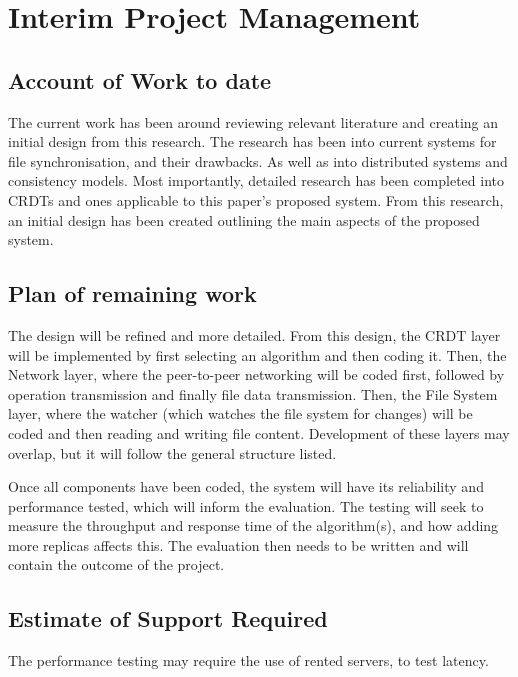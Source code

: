 \documentclass[12pt]{report}
\begin{document}
\printbibliography

\appendix

\chapter{Interim Project Management}

\section{Account of Work to date}
The current work has been around reviewing relevant literature and creating an initial design from this research. The research has been into current systems for file synchronisation, and their drawbacks. As well as into distributed systems and consistency models. Most importantly, detailed research has been completed into CRDTs and ones applicable to this paper's proposed system. From this research, an initial design has been created outlining the main aspects of the proposed system.

\section{Plan of remaining work}
The design will be refined and more detailed. From this design, the CRDT layer will be implemented by first selecting an algorithm and then coding it. Then, the Network layer, where the peer-to-peer networking will be coded first, followed by operation transmission and finally file data transmission. Then, the File System layer, where the watcher (which watches the file system for changes) will be coded and then reading and writing file content. Development of these layers may overlap, but it will follow the general structure listed. \par
Once all components have been coded, the system will have its reliability and performance tested, which will inform the evaluation. The testing will seek to measure the throughput and response time of the algorithm(s), and how adding more replicas affects this. The evaluation then needs to be written and will contain the outcome of the project.

\section{Estimate of Support Required}
The performance testing may require the use of rented servers, to test latency.
\end{document}
